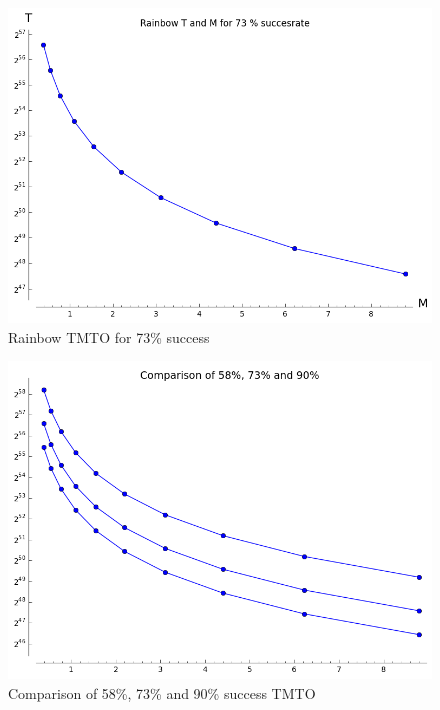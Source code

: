 \begin{figure}[H]
  \centering
  \includegraphics[scale=0.5]{figures/RainbowTime73.png}
  \caption{Rainbow TMTO for 73\% success}
  
\end{figure}

\begin{figure}[H]
  \centering
  \includegraphics[scale=0.4]{figures/RainbowAllCalc.png}
  \caption{Comparison of 58\%, 73\% and 90\% success TMTO}
  \label{fig:comparisonrain}
\end{figure}


